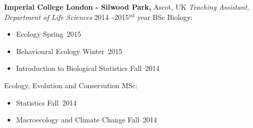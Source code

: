 
\vspace{5pt}

\textbf{Imperial College London - Silwood Park,} Ascot, UK \newline
\emph{Teaching Assistant, Department of Life Sciences} \hfill{2014–-2015}$^{nd}$ year BSc Biology:
\begin{itemize}
  \item Ecology \hfill{Spring~2015}
  \item Behavioural Ecology \hfill{Winter~2015}
  \item Introduction to Biological Statistics \hfill{Fall~2014}
\end{itemize}

Ecology, Evolution and Conservation MSc:
\begin{itemize}
  \item Statistics \hfill{Fall~2014}
  \item Macroecology and Climate Change \hfill{Fall~2014}
\end{itemize}
